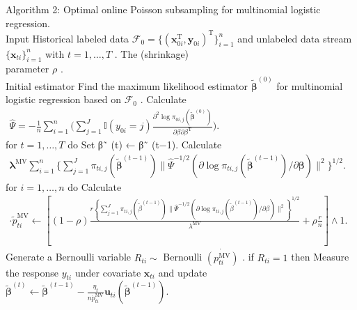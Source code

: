 \documentclass[
  10
]{article}
\begin{document}
Algorithm 2: Optimal online Poisson subsampling for multinomial logistic
regression.\\
Input Historical labeled data
\(\mathcal { F } _ { 0 } = \{ ( \boldsymbol { x } _ { 0 i } ^ { \mathrm { T } } , \boldsymbol { y } _ { 0 i } ) ^ { \mathrm { T } } \} _ { i = 1 } ^ { n }\)
and unlabeled data stream
\(\{ \pmb { x } _ { t i } \} _ { i = 1 } ^ { n }\) with
\(t = 1 , \dots , T\) . The (shrinkage)\\
parameter \(\rho\) .\\
Initial estimator Find the maximum likelihood estimator
\(\tilde { \boldsymbol { \beta } } ^ { ( 0 ) }\) for multinomial
logistic regression based on \(\mathcal { F } _ { 0 }\) . Calculate\\
\(\begin{array} { r } { \hat { \Psi } = - \frac { 1 } { n } \sum _ { i = 1 } ^ { n } \bigg ( \sum _ { j = 1 } ^ { J } \mathbb { I } ( y _ { 0 i } = j ) \frac { \partial ^ { 2 } \log \pi _ { 0 i , j } ( \tilde { \pmb { \beta } } ^ { ( 0 ) } ) } { \partial \beta \partial \beta ^ { \mathrm { T } } } \bigg ) . } \end{array}\)\\
for \(t = 1 , \dots , T\) do Set β˜ (t) ← β˜ (t−1). Calculate
\(\begin{array} { r } { \boldsymbol { \lambda } ^ { \mathrm { M V } }  \sum _ { i = 1 } ^ { n } \Big \{ \sum _ { j = 1 } ^ { J } \pi _ { t i , j } ( \tilde { \pmb { \beta } } ^ { ( t - 1 ) } ) \| \hat { \Psi } ^ { - 1 / 2 } ( \partial \log \pi _ { t i , j } ( \tilde { \pmb { \beta } } ^ { ( t - 1 ) } ) / \partial \pmb { \beta } ) \| ^ { 2 } \Big \} ^ { 1 / 2 } . } \end{array}\)
for \(i = 1 , \ldots , n\) do Calculate
\(\begin{array} { r } { \cdot \tilde { p } _ { t i } ^ { \mathrm { M V } } \gets \left[ ( 1 - \rho ) \frac { r \left\{ \sum _ { j = 1 } ^ { J } \pi _ { t i , j } ( \tilde { \beta } ^ { ( t - 1 ) } ) \| \hat { \Psi } ^ { - 1 / 2 } ( \partial \log \pi _ { t i , j } ( \tilde { \beta } ^ { ( t - 1 ) } ) / \partial \beta ) \| ^ { 2 } \right\} ^ { 1 / 2 } } { \lambda ^ { \mathrm { M V } } } + \rho \frac { r } { n } \right] \wedge 1 . } \end{array}\)
Generate a Bernoulli variable \(R _ { t i } \sim\) Bernoulli
\(\dot { ( p _ { t i } ^ { \mathrm { M V } } ) }\) . if
\(R _ { t i } = 1\) then Measure the response \(y _ { t i }\) under
covariate \(\pmb { x } _ { t i }\) and update
\(\tilde { \pmb \beta } ^ { ( t ) } \gets \tilde { \pmb \beta } ^ { ( t - 1 ) } - \frac { \eta _ { t } } { n \dot { p } _ { t i } ^ { \mathrm { M V } } } \pmb u _ { t i } ( \tilde { \pmb \beta } ^ { ( t - 1 ) } ) .\)
\end{document}
